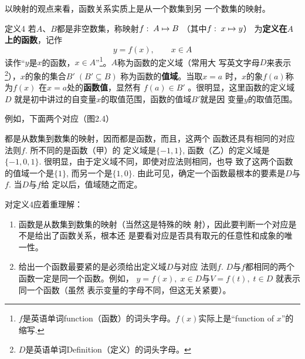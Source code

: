 以映射的观点来看，函数关系实质上是从一个数集到另
一个数集的映射。

\begin{thm}{定义4}
   若$A$、$B$都是非空数集，称映射$f:\; A\mapsto B$
（其中$f:\; x\mapsto y$）
为\textbf{定义在$A$上的函数}，记作
\[y=f(x),\qquad x\in A\]
读作“$y$是$x$的函数，$x\in A$”\footnote{$f$是英语单词function（函数）的词头字母。$f(x)$实际上是“function
of $x$”的缩写.}。$A$称为函数的定义域（常用大
写英文字母$D$来表示\footnote{$D$是英语单词Definition（定义）的词头字母。}），$x$的象的集合$B'\; (B'\subseteq B)$
称为函数的\textbf{值域}。当取$x=a$
时，$x$的象$f(a)$称为$f(x)$
在$x=a$处的\textbf{函数值}，显然有
$f(a)\in B'$
。很明显，这里函数的定义域$D$
就是初中讲过的自变量$x$的取值范围，函数的值域$B'$就是因
变量$y$的取值范围。
\end{thm}

例如，下面两个对应（图2.4）
\begin{figure}[htp]
    \centering
{}
    \caption{}
\end{figure}

都是从数集到数集的映射，因而都是函数，而且，这两个
函数还具有相同的对应法则$f$. 所不同的是函数（甲）的
定义域是$\{-1,1\}$, 函数（乙）的定义域是$\{-1,0,
1\}$. 很明显，由于定义域不同，即使对应法则相同，也导
致了这两个函数的值域一个是$\{1\}$, 而另一个是$\{1,0\}$. 
由此可见，确定一个函数最根本的要素是$D$与$f$. 当$D$与$f$给
定以后，值域随之而定。

对定义4应着重理解：
\begin{enumerate}
    \item 函数是从数集到数集的映射（当然这是特殊的映
    射），因此要判断一个对应是不是给出了函数关系，根本还
    是要看对应是否具有取元的任意性和成象的唯一性。
    \item 给出一个函数最要紧的是必须给出定义域$D$与对应
    法则$f$. $D$与$f$都相同的两个函数一定是同一个函数。例如，
    $y=f(x),\; x\in D$与$V=f(t),\; t\in D$
    就表示同一个函数（虽然
    表示变量的字母不同，但这无关紧要）。
\end{enumerate}

